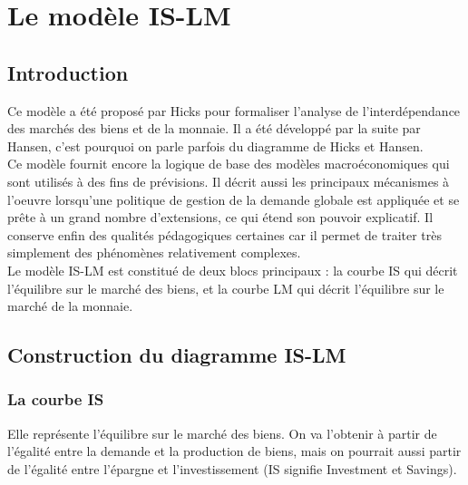 \documentclass[10pt]{book}
\begin{document}
\chapter{Le modèle IS-LM}
\section{Introduction}
Ce modèle a été proposé par Hicks pour formaliser l'analyse de l'interdépendance des marchés des biens et de la monnaie. Il a été développé par la suite par Hansen, c'est pourquoi on parle parfois du diagramme de Hicks et Hansen. \\
Ce modèle fournit encore la logique de base des modèles macroéconomiques qui sont utilisés à des fins de prévisions. Il décrit aussi les principaux mécanismes à l'oeuvre lorsqu'une politique de gestion de la demande globale est appliquée et se prête à un grand nombre d'extensions, ce qui étend son pouvoir explicatif. Il conserve enfin des qualités pédagogiques certaines car il permet de traiter très simplement des phénomènes relativement complexes. \\
Le modèle IS-LM est constitué de deux blocs principaux : la courbe IS qui décrit l'équilibre sur le marché des biens, et la courbe LM qui décrit l'équilibre sur le marché de la monnaie.
\section{Construction du diagramme IS-LM}
\subsection{La courbe IS}
Elle représente l'équilibre sur le marché des biens. On va l'obtenir à partir de l'égalité entre la demande et la production de biens, mais on pourrait aussi partir de l'égalité entre l'épargne et l'investissement (IS signifie Investment et Savings).
\end{document}
